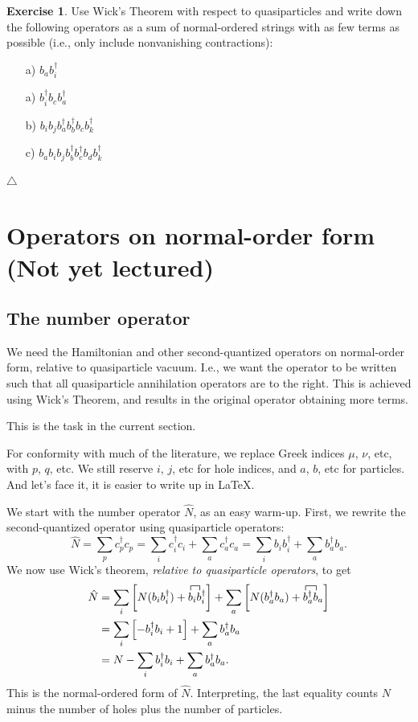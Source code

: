 \documentclass{report}
\theoremstyle{plain}
\theoremstyle{definition}
\newtheorem{exerc}{Exercise}[chapter]
\newcommand\xqed[1]{%
  \leavevmode\unskip\penalty9999 \hbox{}\nobreak\hfill
  \quad\hbox{#1}}
\newcommand\demo{\xqed{$\triangle$}}
\newenvironment{exercise}{\bigskip\begin{exerc}}{\demo\end{exerc}\bigskip}
\begin{document}
\begin{exercise}
  Use Wick's Theorem with respect to quasiparticles and write down the
  following operators as a sum of normal-ordered strings with as few
  terms as possible (i.e., only include nonvanishing contractions):
  \begin{enumerate}
  \item[a)] $b_a b^\dag_i$
  \item[a)] $b^\dag_i b_c b^\dag_a$
  \item[b)] $b_i b_j b^\dag_a b^\dag_b b_c b^\dag_k$
  \item[c)] $b_a b_i b_j b^\dag_b b^\dag_c b_d b^\dag_k$
  \end{enumerate}
\end{exercise}

\section{Operators on normal-order form (Not yet lectured)}

\subsection{The number operator}

We need the Hamiltonian and other second-quantized operators on
normal-order form, relative to quasiparticle vacuum. I.e., we want the
operator to be written such that all quasiparticle annihilation
operators are to the right. This is achieved using Wick's Theorem, and
results in the original operator obtaining more terms.

This is the task in the current section.

For conformity with much of the literature, we replace Greek indices
$\mu$, $\nu$, etc, with $p$, $q$, etc. We still reserve $i$, $j$, etc
for hole indices, and $a$, $b$, etc for particles. And let's face it,
it is easier to write up in \LaTeX.

We start with the number operator $\hat{N}$, as an easy
warm-up. First, we rewrite the second-quantized operator using
quasiparticle operators:
\begin{equation}
  \hat{N} = \sum_p c^\dag_p c_p = \sum_i c^\dag_i c_i + \sum_a
  c^\dag_a c_a = \sum_i b_i b^\dag_i + \sum_a b^\dag_a b_a .
\end{equation}
We now use Wick's theorem, \emph{relative to quasiparticle
  operators}, to get
\begin{equation}
  \begin{split}
    \hat{N} &= \sum_i \left[ N(b_i b^\dag_i) +
      \contraction{}{b}{{}_i }{b} b_i b^\dag_i \right] + \sum_a \left[ N(b^\dag_a b_a) +
      \contraction{}{b}{{}^\dag_a }{b} b^\dag_a b_a \right] \\
    &= \sum_i \left[ -b^\dag_i b_i + 1 \right] + \sum_a b^\dag_a b_a
    \\
    &= N - \sum_i b^\dag_i b_i + \sum_a b^\dag_a b_a.
  \end{split}
\end{equation}
This is the normal-ordered form of $\hat{N}$. Interpreting, the last
equality counts $N$ minus the number of holes plus the number of
particles.
\end{document}
